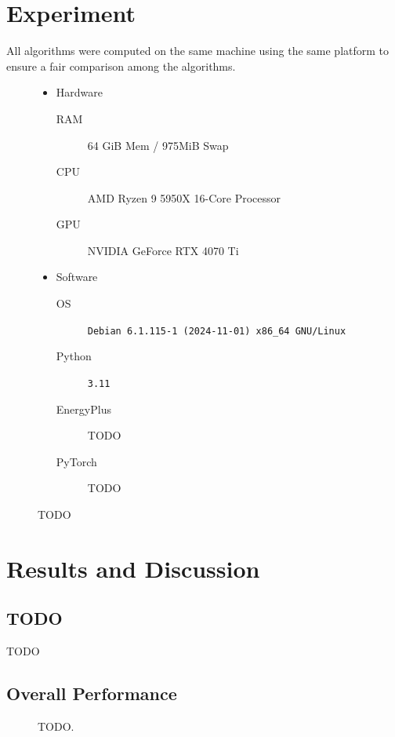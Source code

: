 \documentclass[preprint,12pt]{elsarticle}
\newcommand{\figurestorepath}{../packages/hvacmarl6e43_notebooks/__datastore__}
\begin{document}
\section{Experiment}

All algorithms were computed on the same machine using the same platform 
to ensure a fair comparison among the algorithms. 

\begin{figure}[H]
    \caption{TODO}
    \centering
    \begin{itemize}
        \item Hardware
            \begin{description}
                \item[RAM] 64 GiB Mem / 975MiB Swap
                \item[CPU] AMD Ryzen 9 5950X 16-Core Processor
                \item[GPU] NVIDIA GeForce RTX 4070 Ti
            \end{description}
        \item Software
            \begin{description}
                \item[OS] \texttt{Debian 6.1.115-1 (2024-11-01) x86_64 GNU/Linux}
                \item[Python] \texttt{3.11}
                \item[EnergyPlus] TODO
                \item[PyTorch] TODO
            \end{description}
    \end{itemize}
\end{figure}


\section{Results and Discussion}

\subsection{TODO}

TODO

\subsection{Overall Performance}

\begin{figure}[H]
    \centering
    \caption{TODO.}
\end{figure}
\end{document}
